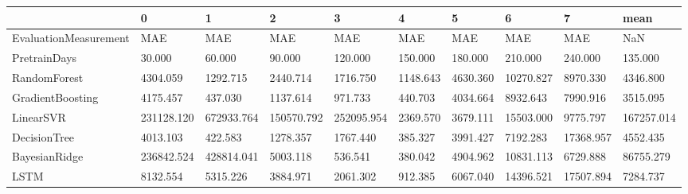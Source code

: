 \begin{tabular}{llllllllll}
\toprule
{} &          0 &          1 &          2 &          3 &        4 &        5 &         6 &         7 &       mean \\
\midrule
EvaluationMeasurement &        MAE &        MAE &        MAE &        MAE &      MAE &      MAE &       MAE &       MAE &        NaN \\
PretrainDays          &     30.000 &     60.000 &     90.000 &    120.000 &  150.000 &  180.000 &   210.000 &   240.000 &    135.000 \\
RandomForest          &   4304.059 &   1292.715 &   2440.714 &   1716.750 & 1148.643 & 4630.360 & 10270.827 &  8970.330 &   4346.800 \\
GradientBoosting      &   4175.457 &    437.030 &   1137.614 &    971.733 &  440.703 & 4034.664 &  8932.643 &  7990.916 &   3515.095 \\
LinearSVR             & 231128.120 & 672933.764 & 150570.792 & 252095.954 & 2369.570 & 3679.111 & 15503.000 &  9775.797 & 167257.014 \\
DecisionTree          &   4013.103 &    422.583 &   1278.357 &   1767.440 &  385.327 & 3991.427 &  7192.283 & 17368.957 &   4552.435 \\
BayesianRidge         & 236842.524 & 428814.041 &   5003.118 &    536.541 &  380.042 & 4904.962 & 10831.113 &  6729.888 &  86755.279 \\
LSTM                  &   8132.554 &   5315.226 &   3884.971 &   2061.302 &  912.385 & 6067.040 & 14396.521 & 17507.894 &   7284.737 \\
\bottomrule
\end{tabular}
